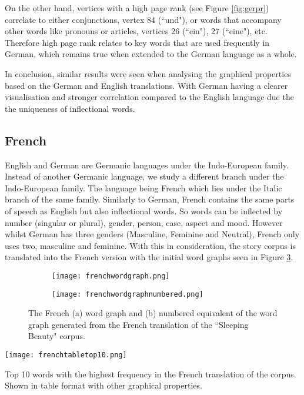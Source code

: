 On the other hand, vertices with a high page rank (see Figure \ref{fig:gerpr}) correlate to either conjunctions, vertex 84 (``und"), or words that accompany other words like pronouns or articles, vertices 26 (``ein"), 27 (``eine"), etc. Therefore high page rank relates to key words that are used frequently in German, which remains true when extended to the German language as a whole.

In conclusion, similar results were seen when analysing the graphical properties based on the German and English translations. With German having a clearer visualisation and stronger correlation compared to the English language due the the uniqueness of inflectional words.

\subsection{French}
English and German are Germanic languages under the Indo-European family. Instead of another Germanic language, we study a different branch under the Indo-European family. The language being French which lies under the Italic branch of the same family. Similarly to German, French contains the same parts of speech as English but also inflectional words. So words can be inflected by number (singular or plural), gender, person, case, aspect and mood. However whilst German has three genders (Masculine, Feminine and Neutral), French \cite{hawkins2015french} only uses two, masculine and feminine. With this in consideration, the story corpus is translated into the French version with the initial word graphs seen in Figure \ref{fig:fregraph}. 

\begin{figure}[!htb]
\centering
\begin{subfigure}{.45\textwidth}
	\texttt{[image: frenchwordgraph.png]}
	\caption{}
	\label{fig:freword}
\end{subfigure}
\hfill
\begin{subfigure}{.45\textwidth}
	\texttt{[image: frenchwordgraphnumbered.png]}
	\caption{}
	\label{fig:frenum}
\end{subfigure}
\caption{The French (a) word graph and (b) numbered equivalent of the word graph generated from the French translation of the ``Sleeping Beauty" corpus.}
\label{fig:fregraph}
\end{figure}

\begin{table}[!htb]
\centering
\texttt{[image: frenchtabletop10.png]}
\caption{Top 10 words with the highest frequency in the French translation of the corpus. Shown in table format with other graphical properties. }
\label{table:frenchtop}
\end{table}

